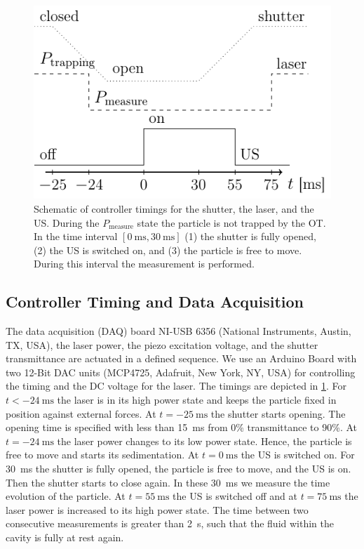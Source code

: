 \begin{figure}[H]
  \centering
  \includegraphics[]{External/daq-sync.pdf}
  \caption{Schematic of controller timings for the shutter, the laser, and the 
      US. During the $P_{\text{measure}}$ state the particle is not trapped by 
  the OT. In the time interval $[\SI{0}{\ms}, \SI{30}{\ms}]$ (1) the shutter is 
  fully opened, (2) the US is switched on, and (3) the particle is free to 
  move. During this interval the measurement is performed.}\label{fig:TC-daq-sync}
\end{figure}

\subsection{Controller Timing and Data Acquisition}

The data acquisition (DAQ) board NI-USB 6356 (National Instruments, Austin, TX, 
USA), the laser power, the piezo excitation voltage, and the shutter 
transmittance are actuated in a defined sequence. We use an Arduino Board with 
two 12-Bit DAC units (MCP4725, Adafruit, New York, NY, USA) for controlling the 
timing and the DC voltage for the laser. The timings are depicted in 
\cref{fig:TC-daq-sync}. For $t<-\SI{24}{\ms}$ the laser is in its high power state 
and keeps the particle fixed in position against external forces. At 
$t=\SI{-25}{\ms}$ the shutter starts opening. The opening time is specified 
with less than \SI{15}{\ms} from 0\% transmittance to 90\%. At 
$t=\SI{-24}{\ms}$ the laser power changes to its low power state. Hence, the 
particle is free to move and starts its sedimentation. At $t=\SI{0}{\ms}$ the 
US is switched on. For \SI{30}{\ms} the shutter is fully opened, the particle 
is free to move, and the US is on. Then the shutter starts to close again. In 
these \SI{30}{\ms} we measure the time evolution of the particle. At 
$t=\SI{55}{\ms}$ the US is switched off and at $t=\SI{75}{\ms}$ the laser power 
is increased to its high power state. The time between two consecutive 
measurements is greater than \SI{2}{\s}, such that the fluid within the cavity 
is fully at rest again.

